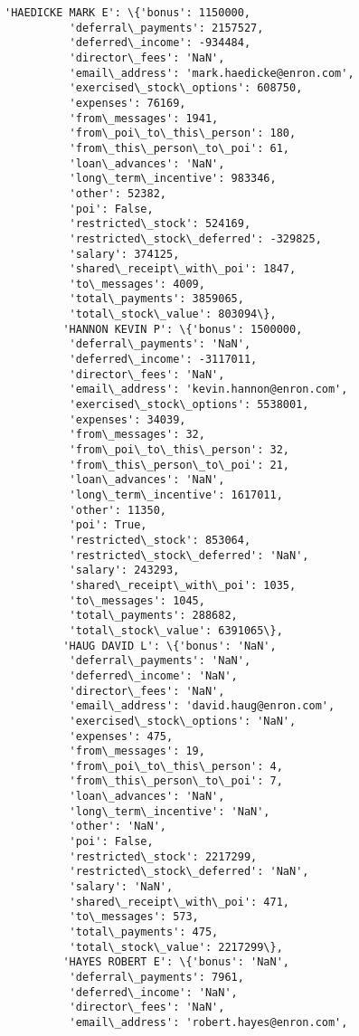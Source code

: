 \documentclass[11pt]{article}
\begin{document}
\begin{Verbatim}[commandchars=\\\{\}]
         'HAEDICKE MARK E': \{'bonus': 1150000,
          'deferral\_payments': 2157527,
          'deferred\_income': -934484,
          'director\_fees': 'NaN',
          'email\_address': 'mark.haedicke@enron.com',
          'exercised\_stock\_options': 608750,
          'expenses': 76169,
          'from\_messages': 1941,
          'from\_poi\_to\_this\_person': 180,
          'from\_this\_person\_to\_poi': 61,
          'loan\_advances': 'NaN',
          'long\_term\_incentive': 983346,
          'other': 52382,
          'poi': False,
          'restricted\_stock': 524169,
          'restricted\_stock\_deferred': -329825,
          'salary': 374125,
          'shared\_receipt\_with\_poi': 1847,
          'to\_messages': 4009,
          'total\_payments': 3859065,
          'total\_stock\_value': 803094\},
         'HANNON KEVIN P': \{'bonus': 1500000,
          'deferral\_payments': 'NaN',
          'deferred\_income': -3117011,
          'director\_fees': 'NaN',
          'email\_address': 'kevin.hannon@enron.com',
          'exercised\_stock\_options': 5538001,
          'expenses': 34039,
          'from\_messages': 32,
          'from\_poi\_to\_this\_person': 32,
          'from\_this\_person\_to\_poi': 21,
          'loan\_advances': 'NaN',
          'long\_term\_incentive': 1617011,
          'other': 11350,
          'poi': True,
          'restricted\_stock': 853064,
          'restricted\_stock\_deferred': 'NaN',
          'salary': 243293,
          'shared\_receipt\_with\_poi': 1035,
          'to\_messages': 1045,
          'total\_payments': 288682,
          'total\_stock\_value': 6391065\},
         'HAUG DAVID L': \{'bonus': 'NaN',
          'deferral\_payments': 'NaN',
          'deferred\_income': 'NaN',
          'director\_fees': 'NaN',
          'email\_address': 'david.haug@enron.com',
          'exercised\_stock\_options': 'NaN',
          'expenses': 475,
          'from\_messages': 19,
          'from\_poi\_to\_this\_person': 4,
          'from\_this\_person\_to\_poi': 7,
          'loan\_advances': 'NaN',
          'long\_term\_incentive': 'NaN',
          'other': 'NaN',
          'poi': False,
          'restricted\_stock': 2217299,
          'restricted\_stock\_deferred': 'NaN',
          'salary': 'NaN',
          'shared\_receipt\_with\_poi': 471,
          'to\_messages': 573,
          'total\_payments': 475,
          'total\_stock\_value': 2217299\},
         'HAYES ROBERT E': \{'bonus': 'NaN',
          'deferral\_payments': 7961,
          'deferred\_income': 'NaN',
          'director\_fees': 'NaN',
          'email\_address': 'robert.hayes@enron.com',

\end{Verbatim}
\end{document}
